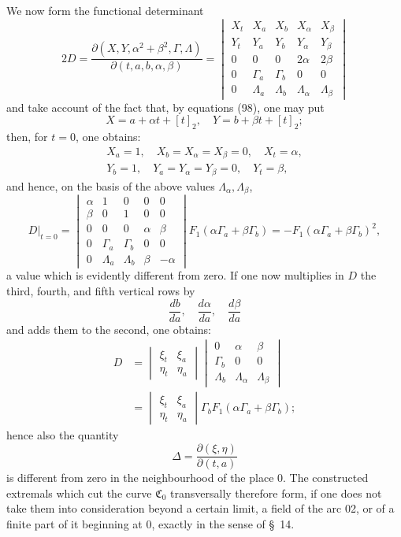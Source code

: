\documentclass[11pt,a4paper,leqno]{article}
\begin{document}
We now form the functional determinant
\[
2D=\frac{\partial(X,Y,\alpha^2+\beta^2,\Gamma,\Lambda)}{\partial(t,a,b,\alpha,\beta)}
=
\begin{vmatrix}
X_t&X_a&X_b&X_{\alpha}&X_{\beta}\\
Y_t&Y_a&Y_b&Y_{\alpha}&Y_{\beta}\\
0&0&0&2\alpha&2\beta\\
0&\Gamma_a&\Gamma_b&0&0\\
0&\Lambda_a&\Lambda_b&\Lambda_{\alpha}&\Lambda_{\beta}
\end{vmatrix}
\]
and take account of the fact that, by equations (98), one may put
\[
X=a+\alpha t+[t]_2,
\quad
Y=b+\beta t+[t]_2;
\]
then, for $t=0$, one obtains:
\[
\begin{gathered}
X_a=1,
\quad X_b=X_{\alpha}=X_{\beta}=0,
\quad X_t=\alpha,\\
Y_b=1,
\quad Y_a=Y_{\alpha}=Y_{\beta}=0,
\quad Y_t=\beta,
\end{gathered}
\]
and hence, on the basis of the above values $\Lambda_{\alpha},\Lambda_{\beta}$,
\[
D\big|_{t=0}=
\begin{vmatrix}
\alpha&1&0&0&0\\
\beta&0&1&0&0\\
0&0&0&\alpha&\beta\\
0&\Gamma_a&\Gamma_b&0&0\\
0&\Lambda_a&\Lambda_b&\beta&-\alpha
\end{vmatrix}
F_1(\alpha\Gamma_a+\beta\Gamma_b)
=-F_1(\alpha\Gamma_a+
\beta\Gamma_b)^2,
\]
a value which is evidently different from zero. If one now multiplies in $D$ the third, fourth, and fifth vertical rows by
\[
\frac{db}{da},\quad \frac{d\alpha}{da},\quad \frac{d\beta}{da}
\]
and adds them to the second, one obtains:
\[
\begin{aligned}
D
&=
\begin{vmatrix}
\xi_t&\xi_a\\
\eta_t&\eta_a
\end{vmatrix}
\begin{vmatrix}
0&\alpha&\beta\\
\Gamma_b&0&0\\
\Lambda_b&\Lambda_{\alpha}&\Lambda_{\beta}
\end{vmatrix}\\
&=
\begin{vmatrix}
\xi_t&\xi_a\\
\eta_t&\eta_a
\end{vmatrix}
\Gamma_bF_1(\alpha\Gamma_a+\beta\Gamma_b);
\end{aligned}
\]
hence also the quantity
\[
\Delta=\frac{\partial(\xi,\eta)}{\partial(t,a)}
\]
is different from zero in the neighbourhood of the place 0. The constructed extremals which cut the curve $\mathfrak C_0$ transversally therefore form, if one does not take them into consideration beyond a certain limit, a field of the arc 02, or of a finite part of it beginning at 0, exactly in the sense of \S~14.
\end{document}
